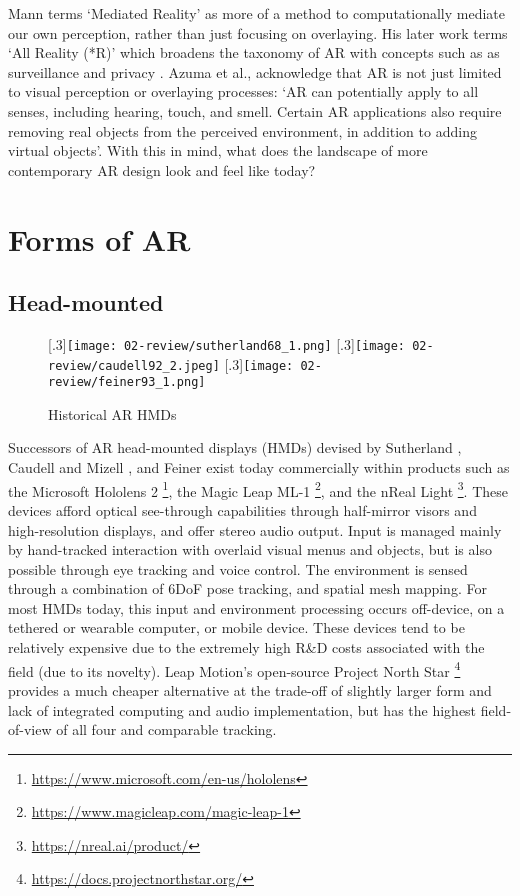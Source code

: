 Mann terms `Mediated Reality' \citeyearpar{mann1994} as more of a method to computationally mediate our own perception, rather than just focusing on overlaying. His later work terms `All Reality (*R)' which broadens the taxonomy of AR with concepts such as as surveillance and privacy \citeyearpar{mann2018}. Azuma et al., acknowledge that AR is not just limited to visual perception or overlaying processes: `AR can potentially apply to all senses, including hearing, touch, and smell. Certain AR applications also require removing real objects from the perceived environment, in addition to adding virtual objects'. With this in mind, what does the landscape of more contemporary AR design look and feel like today?


\section{Forms of AR}\label{sec: ar-forms}
\subsection{Head-mounted}\label{sec: ar-forms-hmd}
\begin{figure}
    \centering
    [.3\linewidth]{\texttt{[image: 02-review/sutherland68\_1.png]}}
    \hfill
    [.3\linewidth]{\texttt{[image: 02-review/caudell92\_2.jpeg]}}
    \hfill
    [.3\linewidth]{\texttt{[image: 02-review/feiner93\_1.png]}}%
    \caption{Historical AR HMDs}
    \label{fig: historicalHMDs}
\end{figure}

Successors of AR head-mounted displays (HMDs) devised by Sutherland \citeyearpar{sutherland1968}, Caudell and Mizell \citeyearpar{caudell1992}, and Feiner \citeyearpar{feiner1993,feiner1997} exist today commercially within products such as the Microsoft Hololens 2 \footnote{\url{https://www.microsoft.com/en-us/hololens}}, the Magic Leap ML-1 \footnote{\url{https://www.magicleap.com/magic-leap-1}}, and the nReal Light \footnote{\url{https://nreal.ai/product/}}. These devices afford optical see-through capabilities through half-mirror visors and high-resolution displays, and offer stereo audio output. Input is managed mainly by hand-tracked interaction with overlaid visual menus and objects, but is also possible through eye tracking and voice control. The environment is sensed through a combination of 6DoF pose tracking, and spatial mesh mapping. For most HMDs today, this input and environment processing occurs off-device, on a tethered or wearable computer, or mobile device. These devices tend to be relatively expensive due to the extremely high R\&D costs associated with the field (due to its novelty). Leap Motion's open-source Project North Star \footnote{\url{https://docs.projectnorthstar.org/}} provides a much cheaper alternative at the trade-off of slightly larger form and lack of integrated computing and audio implementation, but has the highest field-of-view of all four and comparable tracking.

